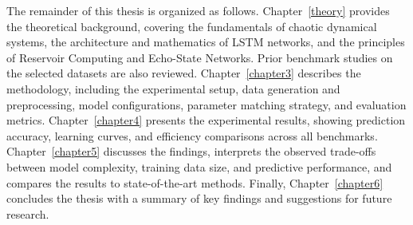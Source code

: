 The remainder of this thesis is organized as follows. Chapter~\ref{theory} provides the theoretical background, covering the fundamentals of chaotic dynamical systems, the architecture and mathematics of LSTM networks, and the principles of Reservoir Computing and Echo-State Networks. Prior benchmark studies on the selected datasets are also reviewed. Chapter~\ref{chapter3} describes the methodology, including the experimental setup, data generation and preprocessing, model configurations, parameter matching strategy, and evaluation metrics. Chapter~\ref{chapter4} presents the experimental results, showing prediction accuracy, learning curves, and efficiency comparisons across all benchmarks. Chapter~\ref{chapter5} discusses the findings, interprets the observed trade-offs between model complexity, training data size, and predictive performance, and compares the results to state-of-the-art methods. Finally, Chapter~\ref{chapter6} concludes the thesis with a summary of key findings and suggestions for future research.
